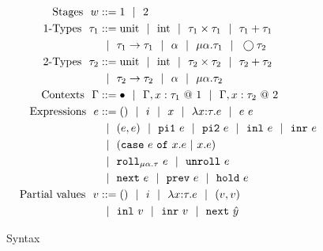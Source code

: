 \begin{figure}
\[\begin{aligned}
\text{Stages}\ \ 
\world &::= \bbone \gbar \bbtwo \\
%
\text{\bbone-Types}\ \ 
\type_1 &::= \text{unit}\gbar\text{int}%
 \gbar \type_1 \times \type_1
 \gbar \type_1 + \type_1 \\
&\gbar \type_1 \to \type_1
 \gbar \alpha \gbar \mu \alpha.\tau_1
 \gbar \fut \type_2 \\
%
\text{\bbtwo-Types}\ \ 
\type_2 &::= \text{unit}\gbar\text{int}%
 \gbar \type_2 \times \type_2
 \gbar \type_2 + \type_2 \\
&\gbar \type_2 \to \type_2
 \gbar \alpha \gbar \mu \alpha.\tau_2 \\
%
\text{Contexts}\ \ 
\context &::=\emptyC
 \gbar \context, x:\tau_1~@~\bbone
 \gbar \context, x:\tau_2~@~\bbtwo \\
%
\text{Expressions}\ \ 
\expr &::= ()\gbar\inte\gbar\var%
 \gbar \lam{\var}{\type}{\expr} 
 \gbar \expr~\expr \\
&\gbar (\expr, \expr) 
 \gbar \pio~\expr 
 \gbar \pit~\expr
 \gbar \inl~\expr 
 \gbar \inr~\expr \\
&\gbar (\caseof {\expr}{\var.\expr}{\var.\expr})
\\ %
&\gbar \roll_{\mu \alpha.\tau}~e
 \gbar \unroll~e\\
&\gbar \next~\expr 
 \gbar \prev~\expr 
 \gbar \pause~\expr \\
%
\text{Partial values}\ \ 
v &::= ()\gbar\inte%
 \gbar \lam{\var}{\type}{\expr} 
 \gbar (v,v) \\
&\gbar \inl~v
 \gbar \inr~v
 \gbar \next~{\hat y} 
\end{aligned}\]
\caption{\lang~Syntax}
\label{fig:grammar}
\end{figure}

